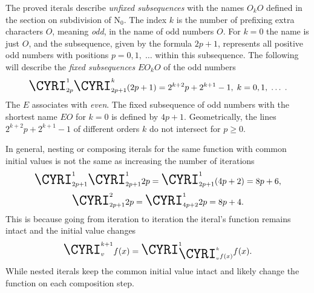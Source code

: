 \documentclass{article}
\begin{document}
The proved iterals describe \textit{unfixed subsequences} with the names $O_k{O}$ defined in the section on subdivision of $\mathrm{N_0}$. The index $k$ is the number of prefixing extra characters $O$, meaning \textit{odd}, in the name of odd numbers $O$. For $k = 0$ the name is just $O$, and the subsequence, given by the formula $2p+1$, represents all positive odd numbers with positions $p = 0, 1, \; \ldots$ within this subsequence. The following will describe the \textit{fixed subsequences} $EO_k{O}$ of the odd numbers
\begin{displaymath}
\textrm{\LARGE{\CYRI}}_{2p}^{1}
\textrm{\LARGE{\CYRI}}_{2p+1}^{k}(2p+1) = 2^{k+2}p+2^{k+1}-1, \; k = 0, 1, \; \ldots \; .
\end{displaymath}
The $E$ associates with \textit{even}. The fixed subsequence of odd numbers with the shortest name $EO$ for $k = 0$ is defined by $4p+1$. Geometrically, the lines $2^{k+2}p+2^{k+1}-1$ of different orders $k$ do not intersect for $p \geq 0$. 

In general, nesting or composing iterals for the same function with common initial values is not the same as increasing the number of iterations
\begin{displaymath}
\textrm{\LARGE{\CYRI}}_{2p+1}^{1}\textrm{\LARGE{\CYRI}}_{2p+1}^{1}2p =
\textrm{\LARGE{\CYRI}}_{2p+1}^{1}(4p+2) = 8p + 6,
\end{displaymath}
\begin{displaymath}
\textrm{\LARGE{\CYRI}}_{2p+1}^{2}2p = \textrm{\LARGE{\CYRI}}_{4p+2}^{1}2p = 8p + 4.
\end{displaymath}
This is because going from iteration to iteration the iteral's function remains intact and the initial value changes
\begin{displaymath}
\textrm{\LARGE{\CYRI}}_{v}^{k+1}f(x) = \textrm{\LARGE{\CYRI}}_{\textrm{\LARGE{\CYRI}}_{v}^{k}f(x)}^{1}f(x).
\end{displaymath}
While nested iterals keep the common initial value intact and likely change the function on each composition step.
\end{document}
